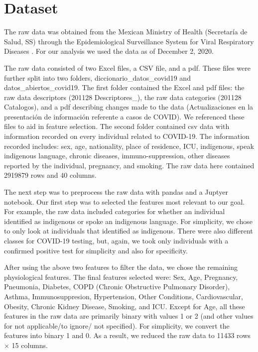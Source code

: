 \documentclass{article}
\begin{document}
\section{Dataset}
The raw data was obtained from the Mexican Ministry of Health (Secretaría de Salud, SS) through the Epidemiological Surveillance System for Viral Respiratory Diseases \cite{gob_mex}. For our analysis we used the data as of December 2, 2020. 

The raw data consisted of two Excel files, a CSV file, and a pdf. These files were further split into two folders, 
diccionario\_datos\_covid19 and datos\_abiertos\_covid19. The first folder contained the Excel and pdf files: the raw data descriptors (201128 Descriptores\_), the raw data categories (201128 Catalogos), and a pdf describing changes made to the data (Actualizaciones en la presentación de información referente a casos de COVID). We referenced these files to aid in feature selection. The second folder contained csv data with information recorded on every individual related to COVID-19. The information recorded includes: sex, age, nationality, place of residence, ICU, indigenous, speak indigenous language, chronic diseases, immuno-suppression, other diseases reported by the individual, pregnancy, and smoking. The raw data here contained 2919879 rows and 40 columns. 

The next step was to preprocess the raw data with pandas and a Juptyer notebook. Our first step was to selected the features most relevant to our goal. For example, the raw data included categories for whether an individual identified as indigenous or spoke an indigenous language. For simplicity, we chose to only look at individuals that identified as indigenous. There were also different classes for COVID-19 testing, but, again, we took only individuals with a confirmed positive test for simplicity and also for specificity.  

After using the above two features to filter the data, we chose the remaining physiological features. The final features selected were: Sex, Age, Pregnancy, Pneumonia, Diabetes, COPD (Chronic Obstructive Pulmonary Disorder), Asthma, Immunosuppresion, Hypertension, Other Conditions, Cardiovascular, Obesity, Chronic Kidney Disease, Smoking, and ICU. Except for Age, all these features in the raw data are primarily binary with values 1 or 2 (and other values for not applicable/to ignore/ not specified). For simplicity, we convert the features into binary 1 and 0. As a result, we reduced the raw data to 11433 rows × 15 columns. 
\end{document}
